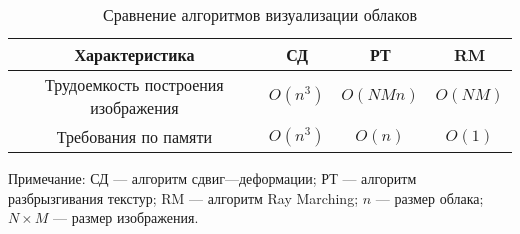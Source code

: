 \begin{table}[H]
	\begin{center}
		\begin{threeparttable}
			\captionsetup{justification=raggedright,singlelinecheck=off}
			\caption{Сравнение алгоритмов визуализации облаков}
			\label{tbl:rend_choice}
			\begin{tabular}{|c|c|c|c|}
				\hline
				Характеристика &  СД  & РТ & RM \\
				\hline
				Трудоемкость построения изображения &  $O(n^3)$  & $O(NMn)$ & $O(NM)$ \\
				\hline
				Требования по памяти & $O(n^3)$ & $O(n)$ & $O(1)$ \\
				\hline
			\end{tabular}
			\begin{tablenotes}
				\small
				\item Примечание:  СД --- алгоритм сдвиг---деформации; РТ --- алгоритм разбрызгивания текстур; RM --- алгоритм Ray Marching; $n$ --- размер облака; $N \times M$ --- размер изображения.
			\end{tablenotes}
		\end{threeparttable}
	\end{center}
\end{table}



